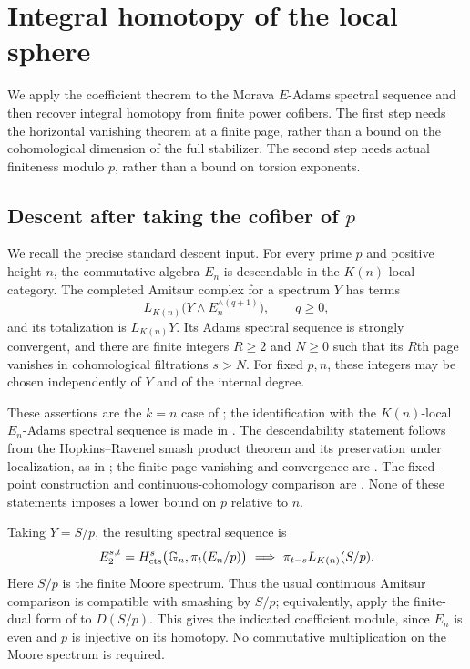 \section{Integral homotopy of the local sphere}
\label{sec:sphere}

We apply the coefficient theorem to the Morava $E$-Adams spectral
sequence and then recover integral homotopy from finite power cofibers.
The first step needs the horizontal vanishing theorem at a finite page,
rather than a bound on the cohomological dimension of the full
stabilizer.  The second step needs actual finiteness modulo $p$, rather
than a bound on torsion exponents.

\subsection{Descent after taking the cofiber of \texorpdfstring{$p$}{p}}

We recall the precise standard descent input.  For every prime $p$ and
positive height $n$, the commutative algebra $E_n$ is descendable in the
$K(n)$-local category.  The completed Amitsur complex for a spectrum $Y$
has terms
\[
 L_{K(n)}\bigl(Y\wedge E_n^{\wedge(q+1)}\bigr),\qquad q\geq0,
\]
and its totalization is $L_{K(n)}Y$.  Its Adams spectral sequence is
strongly convergent, and there are finite integers $R\geq2$ and $N\geq0$
such that its $R$th page vanishes in cohomological filtrations $s>N$.
For fixed $p,n$, these integers may be chosen independently of $Y$ and
of the internal degree.

These assertions are the $k=n$ case of
\citet[Theorem~4.6 and Proposition~4.13]{heard2023}; the identification
with the $K(n)$-local $E_n$-Adams spectral sequence is made in
\citet[Remark~4.14]{heard2023}.  The descendability statement follows
from the Hopkins--Ravenel smash product theorem and its preservation
under localization, as in \citet[Theorem~4.18 and
Proposition~10.10]{mathew2016}; the finite-page vanishing and convergence
are \citet[Corollary~4.4]{mathew2016}.  The fixed-point construction and
continuous-cohomology comparison are
\citet[Theorem~1\textup{(iii)--(iv)} and Appendix~A]{devinatzHopkins2004}.
None of these statements imposes a lower bound on $p$ relative to $n$.

Taking $Y=S/p$, the resulting spectral sequence is
\begin{equation}\label{eq:sphere-modp-descent}
 E_2^{s,t}
   =H^s_{\mathrm{cts}}\bigl(\mathbb G_n,\pi_t(E_n/p)\bigr)
 \ \Longrightarrow\
 \pi_{t-s}L_{K(n)}(S/p).
\end{equation}
Here $S/p$ is the finite Moore spectrum.  Thus the usual continuous
Amitsur comparison is compatible with smashing by $S/p$; equivalently,
apply the finite-dual form of
\citet[Theorem~1\textup{(iv)}]{devinatzHopkins2004} to $D(S/p)$.
This gives the indicated coefficient module, since $E_n$ is even and
$p$ is injective on its homotopy.  No commutative multiplication on the
Moore spectrum is required.

